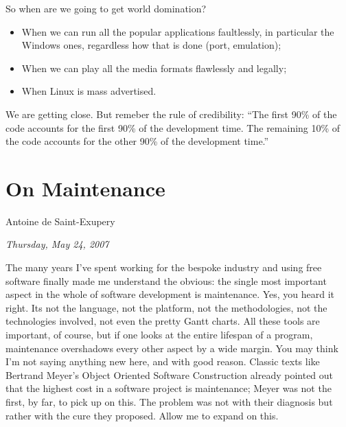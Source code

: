 \documentclass{memoir}
\begin{document}
So when are we going to get world domination?

\begin{itemize}
\item When we can run all the popular applications faultlessly, in
  particular the Windows ones, regardless how that is done (port,
  emulation);
\item When we can play all the media formats flawlessly and legally;
\item When Linux is mass advertised.
\end{itemize}

We are getting close. But remeber the rule of credibility: ``The first
90\% of the code accounts for the first 90\% of the development
time. The remaining 10\% of the code accounts for the other 90\% of
the development time.''

\chapter{On Maintenance}

\begin{epigraphs}
      {Antoine de Saint-Exupery}
\end{epigraphs}

\begin{flushright}
  \emph{Thursday, May 24, 2007}
\end{flushright}

The many years I've spent working for the bespoke industry and using
free software finally made me understand the obvious: the single most
important aspect in the whole of software development is
maintenance. Yes, you heard it right. Its not the language, not the
platform, not the methodologies, not the technologies involved, not
even the pretty Gantt charts. All these tools are important, of
course, but if one looks at the entire lifespan of a program,
maintenance overshadows every other aspect by a wide margin. You may
think I'm not saying anything new here, and with good reason. Classic
texts like Bertrand Meyer's Object Oriented Software Construction
already pointed out that the highest cost in a software project is
maintenance; Meyer was not the first, by far, to pick up on this. The
problem was not with their diagnosis but rather with the cure they
proposed. Allow me to expand on this.
\end{document}
